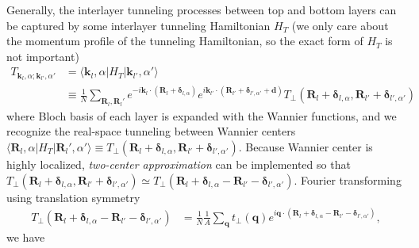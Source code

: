Generally, the interlayer tunneling processes between top and bottom layers can be captured by some interlayer tunneling Hamiltonian $H_T$ (we only care about the momentum profile of the tunneling Hamiltonian, so the exact form of $H_T$ is not important)
\begin{align*}
    T_{\bm k_l,\alpha;\bm k_{l'},\alpha'} & = \langle\bm k_l,\alpha|H_T|\bm k_{l'},\alpha'\rangle                                                                                                                                                                          \\
                                          & \equiv\frac{1}{N}\sum_{\bm R_l,\bm R_l'} e^{-i\bm k_l\cdot(\bm R_l+\bm\delta_{l,\alpha})}e^{i\bm k_{l'}\cdot(\bm R_{l'}+\bm\delta_{l',\alpha'}+\bm d)}T_\perp(\bm R_l+\bm\delta_{l,\alpha}, \bm R_{l'}+\bm\delta_{l',\alpha'})
\end{align*}
where Bloch basis of each layer is expanded with the Wannier functions, and we recognize the real-space tunneling between Wannier centers $\langle\bm R_l,\alpha|H_T|\bm R_l',\alpha'\rangle\equiv T_\perp(\bm R_l+\bm\delta_{l,\alpha}, \bm R_{l'}+\bm\delta_{l',\alpha'})$. Because Wannier center is highly localized, \emph{two-center approximation} \cite{bistritzer2011moire} can be implemented so that $T_\perp(\bm R_l+\bm\delta_{l,\alpha}, \bm R_{l'}+\bm\delta_{l',\alpha'})\simeq T_\perp(\bm R_l+\bm\delta_{l,\alpha} - \bm R_{l'}-\bm\delta_{l',\alpha'})$. Fourier transforming using translation symmetry
\begin{align*}
    T_\perp(\bm R_l+\bm\delta_{l,\alpha} - \bm R_{l'}-\bm\delta_{l',\alpha'}) & = \frac{1}{N}\frac{1}{A}\sum_{\bm q}t_\perp(\bm q) e^{i\bm q\cdot(\bm R_l+\bm\delta_{l,\alpha} - \bm R_{l'}-\bm\delta_{l',\alpha'})},
\end{align*}
we have
